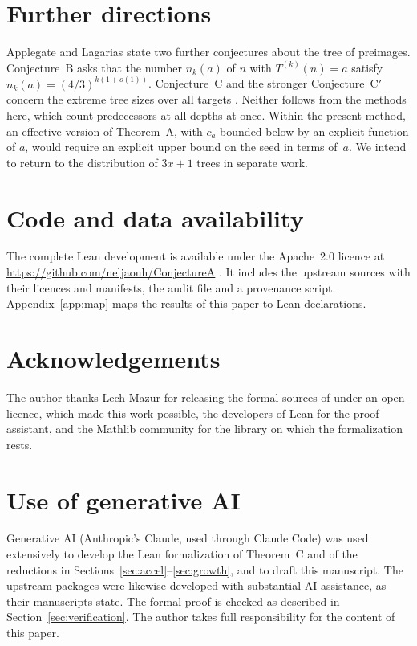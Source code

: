 \documentclass[11pt]{amsart}
\theoremstyle{definition}
\theoremstyle{remark}
\begin{document}
\section{Further directions}\label{sec:further}

Applegate and Lagarias state two further conjectures about the tree of preimages. Conjecture~B asks
that the number $n_k(a)$ of $n$ with $T^{(k)}(n)=a$ satisfy $n_k(a)=(4/3)^{k(1+o(1))}$. Conjecture~C
and the stronger Conjecture~C${}'$ concern the extreme tree sizes over all targets
\cite[\S\S1--2]{AL95a}. Neither follows from the methods here, which count
predecessors at all depths at once. Within the present method, an effective version of Theorem~A, with $c_a$
bounded below by an explicit function of $a$, would require an explicit upper bound on the seed in
terms of~$a$. We intend to return to the distribution of $3x+1$ trees in separate work.

\section*{Code and data availability}
The complete Lean development is available under the Apache~2.0 licence at
\url{https://github.com/neljaouh/ConjectureA} \cite{ConjectureARepo}. It includes the upstream
sources with their licences and manifests, the audit file and a provenance script.
Appendix~\ref{app:map} maps the results of this paper to Lean declarations.

\section*{Acknowledgements}
The author thanks Lech Mazur for releasing the formal sources of \cite{MazurM1,MazurM2} under an
open licence, which made this work possible, the developers of Lean for the proof assistant, and
the Mathlib community for the library on which the formalization rests.

\section*{Use of generative AI}
Generative AI (Anthropic's Claude, used through Claude Code) was used extensively to develop the
Lean formalization of Theorem~C and of the reductions in Sections~\ref{sec:accel}--\ref{sec:growth},
and to draft this manuscript. The upstream packages \cite{MazurM1,MazurM2} were likewise developed with
substantial AI assistance, as their manuscripts state. The formal proof is checked as described in
Section~\ref{sec:verification}. The author takes full responsibility for the content of this paper.
\end{document}
